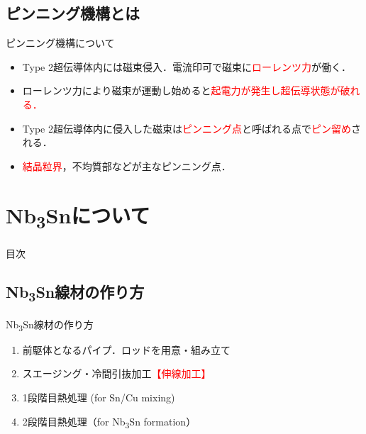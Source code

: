 \documentclass[aspectratio=169, unicode, 10pt]{beamer}
\begin{document}
	\subsection{ピンニング機構とは}
	\begin{frame}{ピンニング機構について}
		\begin{itemize}
			\item Type 2超伝導体内には磁束侵入．電流印可で磁束に\textcolor{red}{ローレンツ力}が働く．
			\item ローレンツ力により磁束が運動し始めると\textcolor{red}{起電力が発生し超伝導状態が破れる．}
			\item Type 2超伝導体内に侵入した磁束は\textcolor{red}{ピンニング点}と呼ばれる点で\textcolor{red}{ピン留め}される．
			\item \textcolor{red}{結晶粒界}，不均質部などが主なピンニング点．
		\end{itemize}
		\vspace{5mm}
		\centering
		\pause{\textcolor{red}{ピンニング点の密度を増加することで臨界電流が向上}}
	\end{frame}

	\section{Nb\textsubscript{3}Snについて}
	\begin{frame}{目次}
	\end{frame}

	\subsection{Nb\textsubscript{3}Sn線材の作り方}
	\begin{frame}{Nb\textsubscript{3}Sn線材の作り方}
		\begin{enumerate}
			\item 前駆体となるパイプ．ロッドを用意・組み立て
			\item スエージング・冷間引抜加工\textcolor{red}{【伸線加工】}
			\item 1段階目熱処理 (for Sn/Cu mixing)
			\item 2段階目熱処理（for Nb\textsubscript{3}Sn formation）
		\end{enumerate}
	\end{frame}
\end{document}
